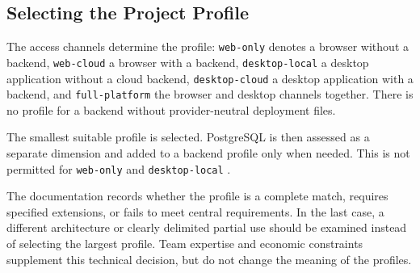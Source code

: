 \subsection{Selecting the Project Profile}
\label{subsec:auswahl-projektprofil}

The access channels determine the profile: \texttt{web-only} denotes a
browser without a backend, \texttt{web-cloud} a browser with a backend,
\texttt{desktop-local} a desktop application without a cloud backend,
\texttt{desktop-cloud} a desktop application with a backend, and
\texttt{full-platform} the browser and desktop channels together. There is no
profile for a backend without provider-neutral deployment files.

The smallest suitable profile is selected. PostgreSQL is then assessed as a
separate dimension and added to a backend profile only when needed. This is
not permitted for \texttt{web-only} and \texttt{desktop-local}
\parencite{kleiveist2026profiles}.

The documentation records whether the profile is a complete match, requires
specified extensions, or fails to meet central requirements. In the last
case, a different architecture or clearly delimited partial use should be
examined instead of selecting the largest profile.
Team expertise and economic constraints supplement this technical decision,
but do not change the meaning of the profiles.
